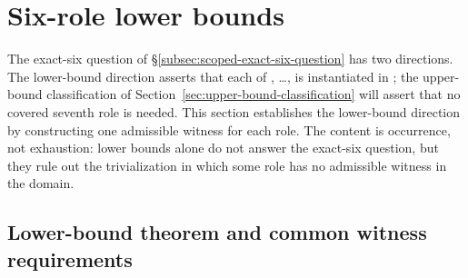 \section{Six-role lower bounds}\label{sec:lower-bounds}

%
%
%


The exact-six question of
\S\ref{subsec:scoped-exact-six-question} has two directions. The
lower-bound direction asserts that each of \Pone{}, \ldots, \Psix{}
is instantiated in \FATCD{}; the upper-bound classification of
Section~\ref{sec:upper-bound-classification} will assert that no
covered seventh role is needed. This section establishes the
lower-bound direction by constructing one admissible witness for each
role. The content is occurrence, not exhaustion: lower bounds alone
do not answer the exact-six question, but they rule out the
trivialization in which some role has no admissible witness in the
domain.

\subsection{Lower-bound theorem and common witness requirements}\label{subsec:lower-bound-theorem}

